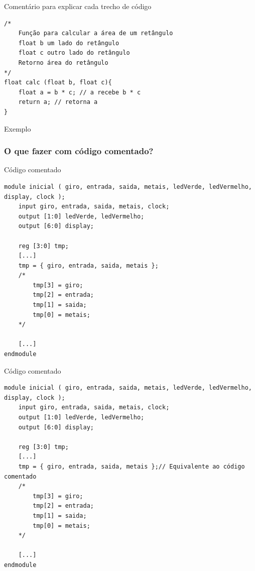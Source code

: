 \begin{frame}[fragile]

	\begin{listing}[H]
		\caption{Comentário para explicar cada trecho de código}
		\begin{verbatim}
/*
	Função para calcular a área de um retângulo
	float b um lado do retângulo
	float c outro lado do retângulo
	Retorno área do retângulo
*/
float calc (float b, float c){
	float a = b * c; // a recebe b * c
	return a; // retorna a
}
		\end{verbatim}
	\end{listing}

\end{frame}

\begin{frame}
	\Huge Exemplo
\end{frame}

\begin{frame}[fragile]
	\frametitle{O que fazer com código comentado?}

	\begin{listing}[H]
		\caption{Código comentado}
		\begin{verbatim}
module inicial ( giro, entrada, saida, metais, ledVerde, ledVermelho, display, clock );
	input giro, entrada, saida, metais, clock;
	output [1:0] ledVerde, ledVermelho;
	output [6:0] display;

	reg [3:0] tmp;
	[...]
	tmp = { giro, entrada, saida, metais };
	/*
		tmp[3] = giro;
		tmp[2] = entrada;
		tmp[1] = saida;
		tmp[0] = metais;
	*/

	[...]
endmodule
		\end{verbatim}
	\end{listing}

\end{frame}

\begin{frame}[fragile]

	\begin{listing}[H]
		\caption{Código comentado}
		\begin{verbatim}
module inicial ( giro, entrada, saida, metais, ledVerde, ledVermelho, display, clock );
	input giro, entrada, saida, metais, clock;
	output [1:0] ledVerde, ledVermelho;
	output [6:0] display;

	reg [3:0] tmp;
	[...]
	tmp = { giro, entrada, saida, metais };// Equivalente ao código comentado
	/*
		tmp[3] = giro;
		tmp[2] = entrada;
		tmp[1] = saida;
		tmp[0] = metais;
	*/

	[...]
endmodule
		\end{verbatim}
	\end{listing}

\end{frame}
